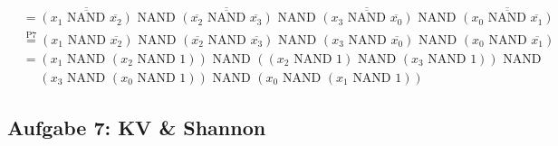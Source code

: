 \documentclass{article}
\def\nand{\text{ NAND }}
\newcommand{\nyet}{\overline}
\begin{document}
\begin{enumerate}
\begin{align*}
			&= \nyet{\nyet{(x_1 \nand \nyet{x_2})}} \nand \nyet{\nyet{(\nyet{x_2} \nand \nyet{x_3})}} \nand \nyet{\nyet{(x_3 \nand \nyet{x_0})}} \nand \nyet{\nyet{(x_0 \nand \nyet{x_1})}} \\
			&\stackrel{\text{P7}}{=} (x_1 \nand \nyet{x_2}) \nand (\nyet{x_2} \nand \nyet{x_3}) \nand (x_3 \nand \nyet{x_0}) \nand (x_0 \nand \nyet{x_1}) \\
			&= (x_1 \nand (x_2 \nand 1)) \nand ((x_2 \nand 1) \nand (x_3 \nand 1)) \nand \\ 
			& \phantom{=} (x_3 \nand (x_0 \nand 1)) \nand (x_0 \nand (x_1 \nand 1)) 
		\end{align*} 
	\end{enumerate}


	\subsection*{Aufgabe 7: KV \& Shannon}
\end{document}

